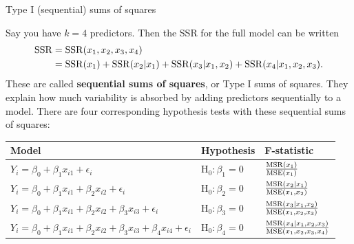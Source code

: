 \documentclass{beamer}
\begin{document}
\begin{frame}{Type I (sequential) sums of squares}
\begin{small}
Say you have $k=4$ predictors. Then the SSR for the full model can be written
\begin{align*}
{\rm SSR}&={\rm SSR}(x_1, x_2, x_3, x_4)\\
&={\rm SSR}(x_1)+{\rm SSR}(x_2|x_1)+{\rm SSR}(x_3|x_1, x_2)+{\rm SSR}(x_4|x_1, x_2, x_3).
\end{align*}
These are called \textbf{sequential sums of squares}, or Type I sums of squares. They explain how much variability is absorbed by adding predictors sequentially to a model. There are four corresponding hypothesis tests with these sequential sums of squares:
\end{small}
\vspace{-10pt}

\begin{table}[h]
\begin{center}
\begin{small}
\begin{tabular}{l l l}
Model & Hypothesis & F-statistic\\
\hline
$Y_i=\beta_0+\beta_1 x_{i1}+\epsilon_i$ & H$_0:\beta_1=0$ & $\frac{{\rm MSR}(x_1)}{{\rm MSE}(x_1)}$\\
$Y_i=\beta_0+\beta_1 x_{i1}+\beta_2 x_{i2}+\epsilon_i$ & H$_0:\beta_2=0$ & $\frac{{\rm MSR}(x_2|x_1)}{{\rm MSE}(x_1,x_2)}$\\
$Y_i=\beta_0+\beta_1 x_{i1}+\beta_2 x_{i2}+\beta_3 x_{i3}+\epsilon_i$ & H$_0:\beta_3=0$ & $\frac{{\rm MSR}(x_3|x_1,x_2)}{{\rm MSE}(x_1,x_2,x_3)}$\\
$Y_i=\beta_0+\beta_1 x_{i1}+\beta_2 x_{i2} + \beta_3 x_{i3}+\beta_4 x_{i4}+\epsilon_i$ & H$_0:\beta_4=0$ & $\frac{{\rm MSR}(x_4|x_1,x_2,x_3)}{{\rm MSE}(x_1,x_2,x_3,x_4)}$
\end{tabular}
\end{small}
\end{center}
\end{table}
\end{frame}
\end{document}
